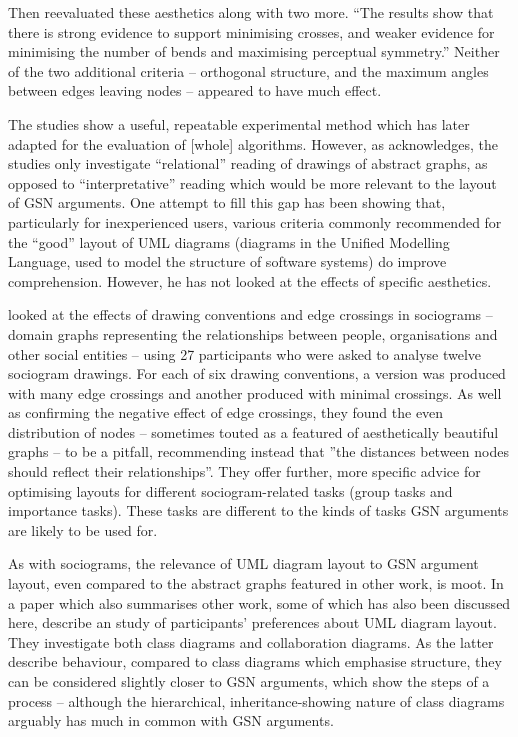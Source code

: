 Then \citet{Purchase1997which} reevaluated these aesthetics along with two more. ``The results show that there is strong
evidence to support minimising crosses, and weaker evidence for minimising the number of bends and maximising perceptual symmetry.''
Neither of the two additional criteria -- orthogonal structure, and the maximum angles between edges leaving nodes -- appeared to have much effect.

The studies show a useful, repeatable experimental method which \citet{PURCHASE1998647} has later adapted for the evaluation of [whole] algorithms.
However, as \citet{Purchase1997which} acknowledges, the studies only investigate ``relational'' reading of drawings of abstract graphs, as opposed to ``interpretative'' reading which would be more relevant to the layout of GSN arguments. One attempt to fill this gap has been \citet{storrle} showing that, particularly for inexperienced users, various criteria commonly recommended for the ``good'' layout of UML diagrams (diagrams in the Unified Modelling Language, used to model the structure of software systems) do improve comprehension. However, he has not looked at the effects of specific aesthetics.

\citet{huang2007effects} looked at the effects of drawing conventions and edge crossings in sociograms -- domain graphs representing the relationships between people, organisations and other social entities -- using 27 participants who were asked to analyse twelve sociogram drawings. For each of six drawing conventions, a version was produced with many edge crossings and another produced with minimal crossings. As well as confirming the negative effect of edge crossings, they found the even distribution of nodes -- sometimes touted as a featured of aesthetically beautiful graphs -- to be a pitfall, recommending instead that ''the distances between nodes should reflect their relationships''. They offer further, more specific advice for optimising layouts for different sociogram-related tasks (group tasks and importance tasks). These tasks are different to the kinds of tasks GSN arguments are likely to be used for. 

As with sociograms, the relevance of UML diagram layout to GSN argument layout, even compared to the abstract graphs featured in other work, is moot. In a paper which also summarises other work, some of which has also been discussed here, \citet{Purchase:2002:EEA:594512.594527} describe an study of participants' preferences about UML diagram layout. They investigate both class diagrams and collaboration diagrams. As the latter describe behaviour, compared to class diagrams which emphasise structure, they can be considered slightly closer to GSN arguments, which show the steps of a process -- although the hierarchical, inheritance-showing nature of class diagrams arguably has much in common with GSN arguments.


